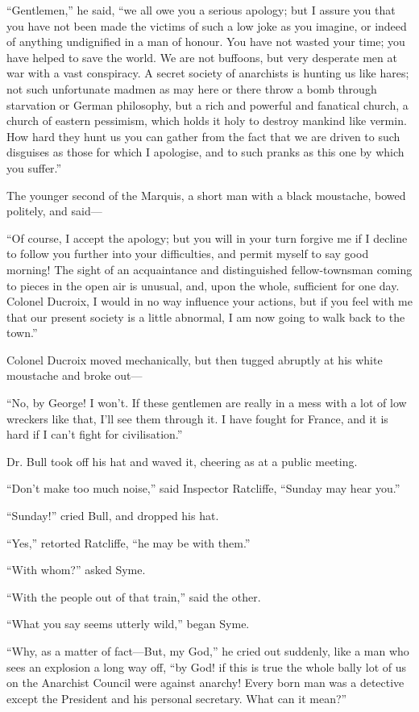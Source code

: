 \documentclass{book}
\begin{document}
“Gentlemen,” he said, “we all owe you a serious apology; but I assure you that you have not been made the victims of such a low joke as you imagine, or indeed of anything undignified in a man of honour. You have not wasted your time; you have helped to save the world. We are not buffoons, but very desperate men at war with a vast conspiracy. A secret society of anarchists is hunting us like hares; not such unfortunate madmen as may here or there throw a bomb through starvation or German philosophy, but a rich and powerful and fanatical church, a church of eastern pessimism, which holds it holy to destroy mankind like vermin. How hard they hunt us you can gather from the fact that we are driven to such disguises as those for which I apologise, and to such pranks as this one by which you suffer.”

The younger second of the Marquis, a short man with a black moustache, bowed politely, and said—

“Of course, I accept the apology; but you will in your turn forgive me if I decline to follow you further into your difficulties, and permit myself to say good morning! The sight of an acquaintance and distinguished fellow-townsman coming to pieces in the open air is unusual, and, upon the whole, sufficient for one day. Colonel Ducroix, I would in no way influence your actions, but if you feel with me that our present society is a little abnormal, I am now going to walk back to the town.”

Colonel Ducroix moved mechanically, but then tugged abruptly at his white moustache and broke out—

“No, by George! I won’t. If these gentlemen are really in a mess with a lot of low wreckers like that, I’ll see them through it. I have fought for France, and it is hard if I can’t fight for civilisation.”

Dr. Bull took off his hat and waved it, cheering as at a public meeting.

“Don’t make too much noise,” said Inspector Ratcliffe, “Sunday may hear you.”

“Sunday!” cried Bull, and dropped his hat.

“Yes,” retorted Ratcliffe, “he may be with them.”

“With whom?” asked Syme.

“With the people out of that train,” said the other.

“What you say seems utterly wild,” began Syme.

“Why, as a matter of fact—But, my God,” he cried out suddenly, like a man who sees an explosion a long way off, “by God! if this is true the whole bally lot of us on the Anarchist Council were against anarchy! Every born man was a detective except the President and his personal secretary. What can it mean?”
\end{document}
